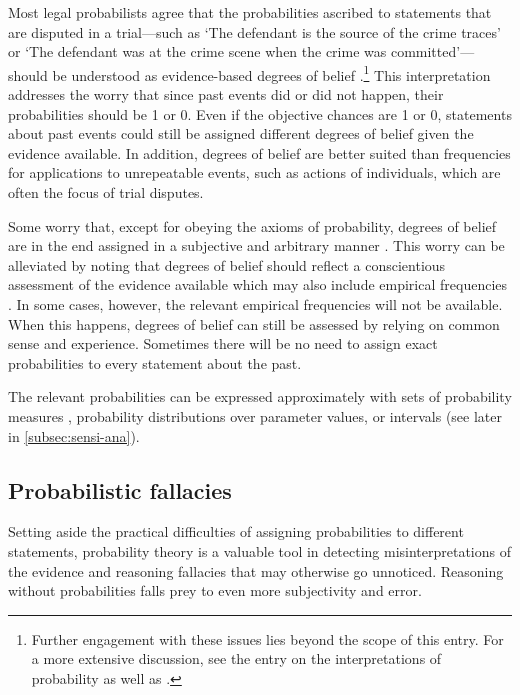 \documentclass{article}
\begin{document}
Most legal probabilists agree 
that the probabilities ascribed to statements that are disputed in a trial---such as `The defendant is the source of the crime traces' or `The defendant was at the crime scene when the crime was committed'---should be understood as evidence-based degrees of belief \citep[see, for example,][]{Cullison1969Probability, kaye79, nance2016}.\footnote{Further engagement with these issues lies beyond the scope of this entry. For a more extensive discussion, see the entry on the interpretations of probability \citep{sep-probability-interpret} 
as well as \citep{skyrms1968choice,gillies2000philosophical,mellor2004probability,childers2013philosophy}.} 
This interpretation addresses the worry that since past events  did or did not happen, their probabilities should be 1 or 0. Even if the objective chances are 1 or 0, 
statements about past events could still be assigned  different degrees of belief  given the evidence available. 
In addition, degrees of belief are better suited than frequencies for applications to unrepeatable events, such as actions of individuals, which are often the focus of trial disputes.  

Some worry that, except for obeying the axioms of probability, degrees of belief are in the end assigned 
in a subjective and arbitrary manner \citep{AllenPardo2019relative}. 
This worry can be  alleviated by noting that degrees of belief should reflect a conscientious assessment of the evidence available which may also include empirical frequencies \citep[see~\ref{sec:fallacies} below and the examples in ][]{enfs2015}. 
In some cases, however, the relevant empirical frequencies will not be available.  
When this happens, degrees of belief can still be assessed by relying on common sense and experience. Sometimes there will be no need to assign exact probabilities to every statement about the past. 

The relevant probabilities can be expressed approximately with  sets of probability measures \citep{walley1991statistical,shafer1976mathematical},  probability distributions over parameter values, or intervals (see later in \ref{subsec:sensi-ana}). %

\subsection{Probabilistic fallacies}\label{sec:fallacies}

Setting aside the practical difficulties of assigning probabilities to different statements,
probability theory is a valuable tool in detecting misinterpretations of the evidence and reasoning fallacies that may otherwise go unnoticed. Reasoning without probabilities falls prey to even more subjectivity and error. 
\end{document}
